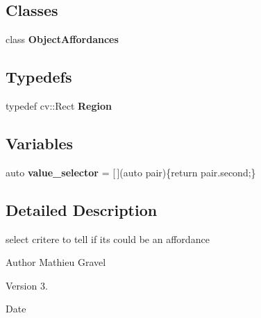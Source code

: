\subsection*{Classes}
\begin{DoxyCompactItemize}
\item 
class \textbf{ Object\+Affordances}
\end{DoxyCompactItemize}
\subsection*{Typedefs}
\begin{DoxyCompactItemize}
\item 
\mbox{\label{_object_aff_8h_ab101634c297e47e838e19cd3ee488750}} 
typedef cv\+::\+Rect {\bfseries Region}
\end{DoxyCompactItemize}
\subsection*{Variables}
\begin{DoxyCompactItemize}
\item 
\mbox{\label{_object_aff_8h_ae2924a638c4bc27aa95ed9e715c7dd6f}} 
auto {\bfseries value\+\_\+selector} = [$\,$](auto pair)\{return pair.\+second;\}
\end{DoxyCompactItemize}


\subsection{Detailed Description}
select critere to tell if it\textquotesingle{}s could be an affordance 

\begin{DoxyAuthor}{Author}
Mathieu Gravel 
\end{DoxyAuthor}
\begin{DoxyVersion}{Version}
3. 
\end{DoxyVersion}
\begin{DoxyDate}{Date}

\end{DoxyDate}
